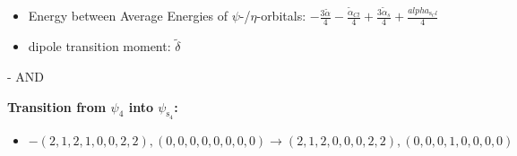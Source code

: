\documentclass[12pt,a4paper]{article}
\begin{document}
\begin{itemize}
                \item Energy between Average Energies of $\psi$-/$\eta$-orbitals: $- \frac{3 \tilde{\alpha}}{4} - \frac{\tilde{\alpha}_{Cl}}{4} + \frac{3 \tilde{\alpha}_{s}}{4} + \frac{alpha_{\text{s}_Cl}}{4}$
            
            \item dipole transition moment: $\tilde{\delta}$
        
        \end{itemize}
        
 -  AND 

        \noindent\textbf{Transition from $\psi_{4}$ into $\psi_{\text{s}_{4}}$:}
        \begin{itemize}
            \item $- (2, 1, 2, 1, 0, 0, 2, 2), (0, 0, 0, 0, 0, 0, 0, 0) \rightarrow (2, 1, 2, 0, 0, 0, 2, 2), (0, 0, 0, 1, 0, 0, 0, 0)$
        

\end{itemize}
\end{document}
